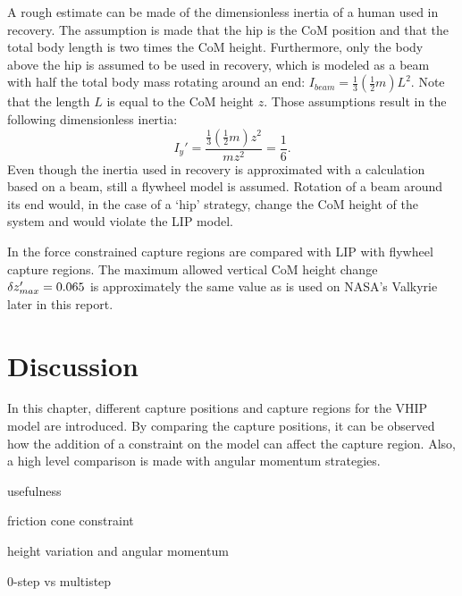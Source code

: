 A rough estimate can be made of the dimensionless inertia of a human used in recovery. The assumption is made that the hip is the \ac{CoM} position and that the total body length is two times the \ac{CoM} height. Furthermore, only the body above the hip is assumed to be used in recovery, which is modeled as a beam with half the total body mass rotating around an end: $I_{beam} = \frac{1}{3}(\frac{1}{2}m)L^2$. Note that the length $L$ is equal to the \ac{CoM} height $z$. Those assumptions result in the following dimensionless inertia:
\begin{equation}
	I_y' = \frac{\frac{1}{3}(\frac{1}{2}m)z^2}{mz^2} = \frac{1}{6}.
\end{equation}
Even though the inertia used in recovery is approximated with a calculation based on a beam, still a flywheel model is assumed. Rotation of a beam around its end would, in the case of a `hip' strategy, change the \ac{CoM} height of the system and would violate the \ac{LIP} model.

In  the force constrained capture regions are compared with \ac{LIP} with flywheel capture regions. The maximum allowed vertical \ac{CoM} height change $\delta z_{max}' =0.065$ is approximately the same value as is used on NASA's Valkyrie later in this report.

\section{Discussion}
In this chapter, different capture positions and capture regions for the \ac{VHIP} model are introduced. By comparing the capture positions, it can be observed how the addition of a constraint on the model can affect the capture region. Also, a high level comparison is made with angular momentum strategies.

usefulness

friction cone constraint

height variation and angular momentum

0-step vs multistep

